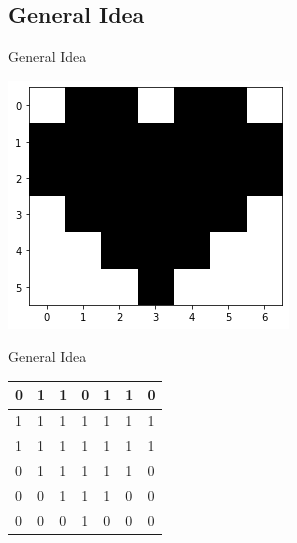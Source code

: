 \documentclass[aspectratio=169]{beamer}
\begin{document}
\subsection{General Idea}
\begin{frame}{General Idea}
  \begin{center}
      \includegraphics[scale=0.5]{images/heart1.png}
  \end{center}
\end{frame}
\begin{frame}{General Idea}
    \begin{table}[h]
\centering
\begin{tabular}{|l|l|l|l|l|l|l|}
\hline
    0 & 1 & 1 & 0 & 1 & 1 & 0\\ \hline
    1 & 1 & 1 & 1 & 1 & 1 & 1\\ \hline
    1 & 1 & 1 & 1 & 1 & 1 & 1\\ \hline
    0 & 1 & 1 & 1 & 1 & 1 & 0\\ \hline
    0 & 0 & 1 & 1 & 1 & 0 & 0\\ \hline
    0 & 0 & 0 & 1 & 0 & 0 & 0\\ \hline
\end{tabular}
\end{table}
\end{frame}
\end{document}
